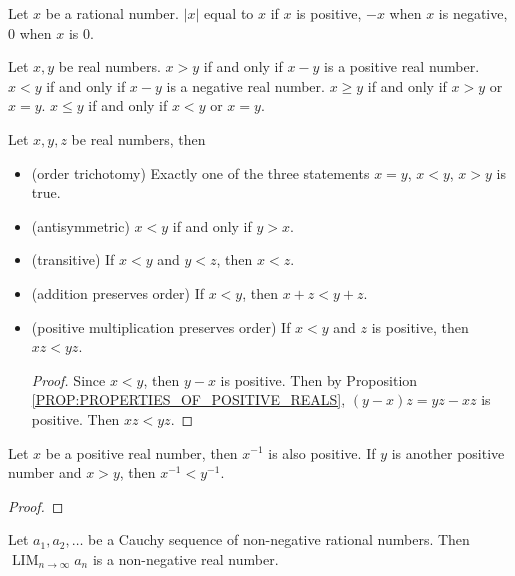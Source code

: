 \documentclass{blog}
\DeclareMathOperator{\LIM}{LIM}
\begin{document}
\begin{definition}
  Let $x$ be a rational number.
  $|x|$ equal to $x$ if $x$ is positive, $-x$ when $x$ is negative, 0 when $x$ is 0.
\end{definition}

\begin{definition}[ordering]
  Let $x, y$ be real numbers.
  $x > y$ if and only if $x - y$ is a positive real number.
  $x < y$ if and only if $x - y$ is a negative real number.
  $x \geq y$ if and only if $x > y$ or $x = y$.
  $x \leq y$ if and only if $x < y$ or $x = y$.
\end{definition}

\begin{proposition}
  Let $x, y, z$ be real numbers, then
  \begin{itemize}
  \item (order trichotomy)
    Exactly one of the three statements $x = y$, $x < y$, $x > y$ is true.
  \item (antisymmetric)
    $x < y$ if and only if $y > x$.
  \item (transitive)
    If $x < y$ and $y < z$, then $x < z$.
  \item (addition preserves order)
    If $x < y$, then $x + z < y + z$.
  \item (positive multiplication preserves order)
    If $x < y$ and $z$ is positive, then $x z < y z$.
    \begin{proof}
      Since $x < y$, then $y - x$ is positive.
      Then by Proposition \ref{PROP:PROPERTIES_OF_POSITIVE_REALS},
      $(y - x) z = y z - x z$ is positive.
      Then $x z < y z$.
    \end{proof}
  \end{itemize}
\end{proposition}

\begin{proposition}
  Let $x$ be a positive real number, then $x^{-1}$ is also positive.
  If $y$ is another positive number and $x > y$, then $x^{-1} < y^{-1}$.
\end{proposition}

\begin{proof}
\end{proof}

\begin{proposition}
  Let $a_{1}, a_{2}, \dots$ be a Cauchy sequence of non-negative rational numbers.
  Then $\LIM_{n \to \infty} a_{n}$ is a non-negative real number.
\end{proposition}
\end{document}
